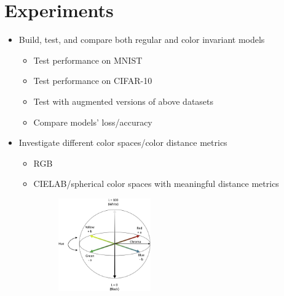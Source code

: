 \documentclass[10pt, a4paper]{article}
\begin{document}
\section{Experiments}
\begin{itemize}
    \item Build, test, and compare both regular and color invariant models
          \begin{itemize}
              \item Test performance on MNIST
              \item Test performance on CIFAR-10
              \item Test with augmented versions of above datasets
              \item Compare models’ loss/accuracy
          \end{itemize}
    \item Investigate different color spaces/color distance metrics
          \begin{itemize}
              \item RGB
              \item CIELAB/spherical color spaces with meaningful distance metrics

                    \begin{figure}[H]
                        \centering
                        \includegraphics[width=0.4\textwidth]{2.png}
                        \caption{}
                        \label{model3}
                    \end{figure}


\end{itemize}
\end{itemize}
\end{document}
